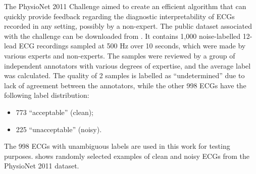 \documentclass[a4paper,10pt]{article}
\begin{document}
The PhysioNet 2011 Challenge \cite{physionet2011paper,goldberger2000physiobank} aimed to create an efficient algorithm that can quickly provide feedback regarding the diagnostic interpretability of ECGs recorded in any setting, possibly by a non-expert. The public dataset associated with the challenge can be downloaded from \cite{physionet2011dataset}. It contains 1,000 noise-labelled 12-lead ECG recordings sampled at 500 Hz over 10 seconds, which were made by various experts and non-experts. The samples were reviewed by a group of independent annotators with various degrees of expertise, and the average label was calculated. The quality of 2 samples is labelled as ``undetermined'' due to lack of agreement between the annotators, while the other 998 ECGs have the following label distribution:
\begin{itemize}
	\item 773 ``acceptable'' (clean);
	\item 225 ``unacceptable'' (noisy).
\end{itemize}
The 998 ECGs with unambiguous labels are used in this work for testing purposes.  shows randomly selected examples of clean and noisy ECGs from the PhysioNet 2011 dataset.
\end{document}
